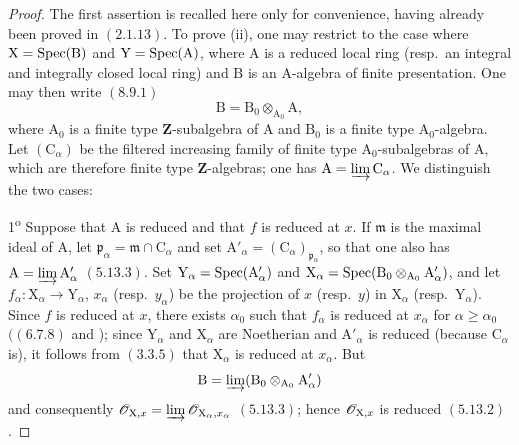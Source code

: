 \begin{proof}
The first assertion is recalled here only for convenience, having already been proved in $(2.1.13)$. To prove (ii), one may restrict to the case where $\mathrm{X}=\operatorname{Spec}(\mathrm{B})$ and $\mathrm{Y}=\operatorname{Spec}(\mathrm{A})$, where $\mathrm{A}$ is a reduced local ring (resp.\ an integral and integrally closed local ring) and $\mathrm{B}$ is an $\mathrm{A}$-algebra of finite presentation. One may then write $(8.9.1)$
\[
  \mathrm{B}=\mathrm{B}_0\otimes_{\mathrm{A}_0}\mathrm{A},
\]
where $\mathrm{A}_0$ is a finite type $\mathbf{Z}$-subalgebra of $\mathrm{A}$ and $\mathrm{B}_0$ is a finite type $\mathrm{A}_0$-algebra. Let $(\mathrm{C}_\alpha)$ be the filtered increasing family of finite type $\mathrm{A}_0$-subalgebras of $\mathrm{A}$, which are therefore finite type $\mathbf{Z}$-algebras; one has $\mathrm{A}=\varinjlim\mathrm{C}_\alpha$. We distinguish the two cases:

1\textsuperscript{o} Suppose that $\mathrm{A}$ is reduced and that $f$ is reduced at $x$. If $\mathfrak{m}$ is the maximal ideal of $\mathrm{A}$, let $\mathfrak{p}_\alpha=\mathfrak{m}\cap\mathrm{C}_\alpha$ and set $\mathrm{A}'_\alpha=(\mathrm{C}_\alpha)_{\mathfrak{p}_\alpha}$, so that one also has $\mathrm{A}=\varinjlim\mathrm{A}'_\alpha$ $(5.13.3)$. Set $\mathrm{Y}_\alpha=\operatorname{Spec}(\mathrm{A}'_\alpha)$ and $\mathrm{X}_\alpha=\operatorname{Spec}(\mathrm{B}_0\otimes_{\mathrm{A}_0}\mathrm{A}'_\alpha)$, and let $f_\alpha:\mathrm{X}_\alpha\to\mathrm{Y}_\alpha$, $x_\alpha$ (resp.\ $y_\alpha$) be the projection of $x$ (resp.\ $y$) in $\mathrm{X}_\alpha$ (resp.\ $\mathrm{Y}_\alpha$). Since $f$ is reduced at $x$, there exists $\alpha_0$ such that $f_\alpha$ is reduced at $x_\alpha$ for $\alpha\geqslant\alpha_0$ $((6.7.8)$ and ); since $\mathrm{Y}_\alpha$ and $\mathrm{X}_\alpha$ are Noetherian and $\mathrm{A}'_\alpha$ is reduced (because $\mathrm{C}_\alpha$ is), it follows from $(3.3.5)$ that $\mathrm{X}_\alpha$ is reduced at $x_\alpha$. But
\[
  \mathrm{B}=\varinjlim(\mathrm{B}_0\otimes_{\mathrm{A}_0}\mathrm{A}'_\alpha)
\]
and consequently $\mathscr{O}_{\mathrm{X},x}=\varinjlim\mathscr{O}_{\mathrm{X}_\alpha,x_\alpha}$ $(5.13.3)$; hence $\mathscr{O}_{\mathrm{X},x}$ is reduced $(5.13.2)$.


\end{proof}
